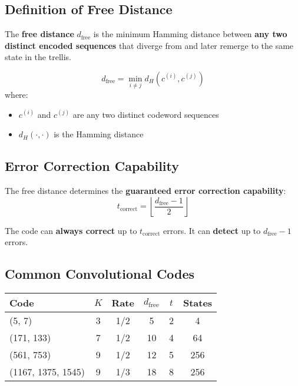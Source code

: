 \subsection{Definition of Free Distance}

The \textbf{free distance} $d_{\text{free}}$ is the minimum Hamming distance between \textbf{any two distinct encoded sequences} that diverge from and later remerge to the same state in the trellis.

\begin{equation}
d_{\text{free}} = \min_{i \neq j} d_H(c^{(i)}, c^{(j)})
\label{eq:free-distance}
\end{equation}
where:
\begin{itemize}
\item $c^{(i)}$ and $c^{(j)}$ are any two distinct codeword sequences
\item $d_H(\cdot, \cdot)$ is the Hamming distance
\end{itemize}

\subsection{Error Correction Capability}

The free distance determines the \textbf{guaranteed error correction capability}:
\begin{equation}
t_{\text{correct}} = \left\lfloor \frac{d_{\text{free}} - 1}{2} \right\rfloor
\label{eq:error-correction-capability}
\end{equation}

The code can \textbf{always correct} up to $t_{\text{correct}}$ errors. It can \textbf{detect} up to $d_{\text{free}} - 1$ errors.

\subsection{Common Convolutional Codes}

\begin{center}
\begin{tabular}{@{}lccccc@{}}
\toprule
\textbf{Code} & \textbf{$K$} & \textbf{Rate} & \textbf{$d_{\text{free}}$} & \textbf{$t$} & \textbf{States} \\
\midrule
(5, 7) & 3 & 1/2 & 5 & 2 & 4 \\
(171, 133) & 7 & 1/2 & 10 & 4 & 64 \\
(561, 753) & 9 & 1/2 & 12 & 5 & 256 \\
(1167, 1375, 1545) & 9 & 1/3 & 18 & 8 & 256 \\
\bottomrule
\end{tabular}
\end{center}

